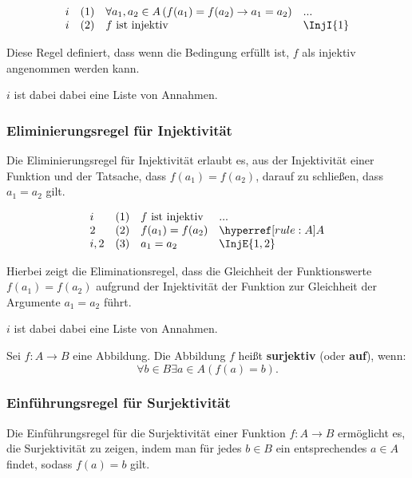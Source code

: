 \documentclass[main.tex]{subfiles}
\begin{document}
\[
\begin{array}{llll}
    i       & (1) & \forall a_1, a_2 \in A \, (f(a_1) = f(a_2) \rightarrow a_1 = a_2) & ... \\
    i       & (2) & f \text{ ist injektiv} & \InjI{1}
\end{array}
\]

Diese Regel definiert, dass wenn die Bedingung erfüllt ist, \( f \) als injektiv angenommen werden kann.

\(i\) ist dabei dabei eine Liste von Annahmen.

\subsubsection*{Eliminierungsregel für Injektivität}
\label{rule:InjE}

Die Eliminierungsregel für Injektivität erlaubt es, aus der Injektivität einer Funktion und der Tatsache, dass \( f(a_1) = f(a_2) \), darauf zu schließen, dass \( a_1 = a_2 \) gilt.

\[
\begin{array}{llll}
    i       & (1) & f \text{ ist injektiv} & ... \\
    2       & (2) & f(a_1) = f(a_2) & \rA \\
    i,2     & (3) & a_1 = a_2 & \InjE{1,2}
\end{array}
\]

Hierbei zeigt die Eliminationsregel, dass die Gleichheit der Funktionswerte \( f(a_1) = f(a_2) \) aufgrund der Injektivität der Funktion zur Gleichheit der Argumente \( a_1 = a_2 \) führt.

\(i\) ist dabei dabei eine Liste von Annahmen.

\begin{definition}[Surjektivität]
    Sei \( f: A \to B \) eine Abbildung. Die Abbildung \( f \) heißt \textbf{surjektiv} (oder \textbf{auf}), wenn: 
    \[
    \forall b\in B\exists a\in A(f(a) = b).
    \]
\end{definition}

\subsubsection*{Einführungsregel für Surjektivität}
\label{rule:SurjI}

Die Einführungsregel für die Surjektivität einer Funktion \( f: A \to B \) ermöglicht es, die Surjektivität zu zeigen, indem man für jedes \( b \in B \) ein entsprechendes \( a \in A \) findet, sodass \( f(a) = b \) gilt.
\end{document}
